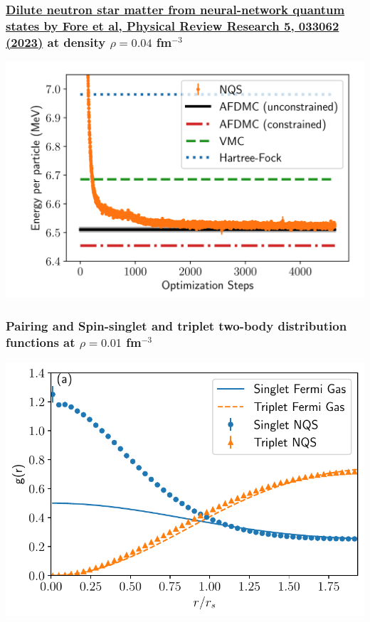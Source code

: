 \documentclass[11pt]{beamer} %
\begin{document}
\begin{frame}
\frametitle{\href{{https://journals.aps.org/prresearch/pdf/10.1103/PhysRevResearch.5.033062}}{Dilute neutron star matter from neural-network quantum states by Fore et al, Physical Review Research 5, 033062 (2023)} at density $\rho=0.04$ fm$^{-3}$}


\vspace{6mm}

\centerline{\includegraphics[width=0.8\linewidth]{figures/nmatter.png}}

\vspace{6mm}

\end{frame}

\begin{frame}
\frametitle{Pairing and Spin-singlet and triplet two-body distribution functions at $\rho=0.01$ fm$^{-3}$}


\vspace{6mm}

\centerline{\includegraphics[width=0.8\linewidth]{figures/01_tbd.pdf}}

\vspace{6mm}

\end{frame}
\end{document}
